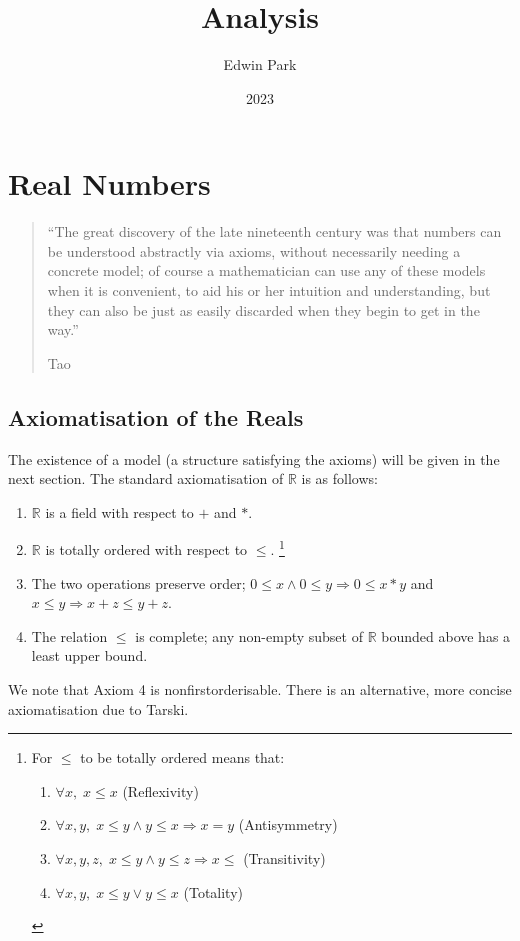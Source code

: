 \documentclass{article}
\title{Analysis}
\author{Edwin Park}
\date{2023}
\theoremstyle{definition}
\begin{document}
\clearpage\maketitle\thispagestyle{empty}
\newpage
\tableofcontents
\newpage\setcounter{page}{1}
\section{Real Numbers}
\begin{quotation}
	``The great discovery of the late nineteenth century was that numbers can be understood abstractly via axioms, without necessarily needing a concrete model; of course a mathematician can use any of these models when it is convenient, to aid his or her intuition and understanding, but they can also be just as easily discarded when they begin to get in the way.''
	\begin{flushright}
		Tao \cite[19]{taoanal1}
	\end{flushright}
\end{quotation}
\subsection{Axiomatisation of the Reals}\label{Axiomatisation of the Reals}
The existence of a model (a structure satisfying the axioms) will be given in the next section.
The standard axiomatisation of $\mathbb{R}$ is as follows:
\begin{enumerate}
	\item $\mathbb{R}$ is a field with respect to $+$ and $*$.
	\item $\mathbb{R}$ is totally ordered with respect to $\leq$.
	\footnote
	{
		For $\leq$ to be totally ordered means that:
		\begin{enumerate}
			\item $\forall x,\; x\leq x$ (Reflexivity)
			\item $\forall x,y,\; x\leq y\land y\leq x\Rightarrow x=y$ (Antisymmetry)
			\item $\forall x,y,z,\; x\leq y\land y\leq z\Rightarrow x\leq$ (Transitivity)
			\item $\forall x,y,\; x\leq y\lor y\leq x$ (Totality)
		\end{enumerate}
	}
	\item The two operations preserve order; $0\leq x\land 0\leq y\Rightarrow0\leq x*y$ and $x\leq y\Rightarrow x+z\leq y+z$.
	\item The relation $\leq$ is complete; any non-empty subset of $\mathbb{R}$ bounded above has a least upper bound.
\end{enumerate}
We note that Axiom 4 is nonfirstorderisable.
There is an alternative, more concise axiomatisation due to Tarski.
\end{document}

